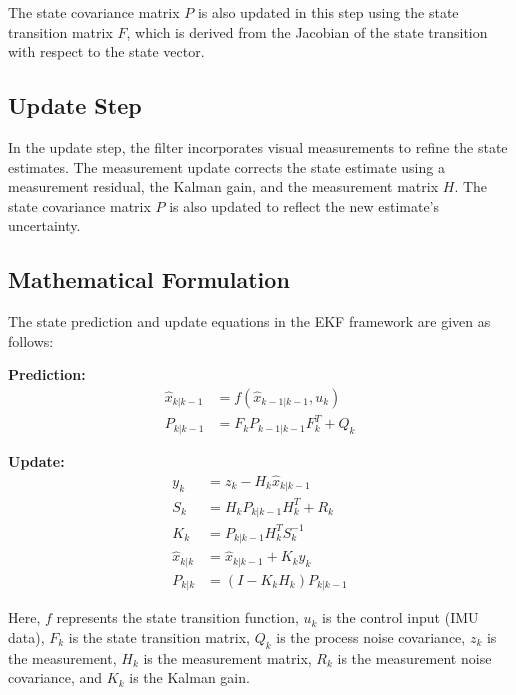 The state covariance matrix \(P\) is also updated in this step using the state transition matrix \(F\), which is derived from the Jacobian of the state transition with respect to the state vector.

\subsection{Update Step}

In the update step, the filter incorporates visual measurements to refine the state estimates. The measurement update corrects the state estimate using a measurement residual, the Kalman gain, and the measurement matrix \(H\). The state covariance matrix \(P\) is also updated to reflect the new estimate's uncertainty.

\subsection{Mathematical Formulation}

The state prediction and update equations in the EKF framework are given as follows:

\textbf{Prediction:}
\begin{align*}
\hat{x}_{k|k-1} &= f(\hat{x}_{k-1|k-1}, u_k) \\
P_{k|k-1} &= F_k P_{k-1|k-1} F_k^T + Q_k
\end{align*}

\textbf{Update:}
\begin{align*}
y_k &= z_k - H_k \hat{x}_{k|k-1} \\
S_k &= H_k P_{k|k-1} H_k^T + R_k \\
K_k &= P_{k|k-1} H_k^T S_k^{-1} \\
\hat{x}_{k|k} &= \hat{x}_{k|k-1} + K_k y_k \\
P_{k|k} &= (I - K_k H_k) P_{k|k-1}
\end{align*}

Here, \(f\) represents the state transition function, \(u_k\) is the control input (IMU data), \(F_k\) is the state transition matrix, \(Q_k\) is the process noise covariance, \(z_k\) is the measurement, \(H_k\) is the measurement matrix, \(R_k\) is the measurement noise covariance, and \(K_k\) is the Kalman gain.